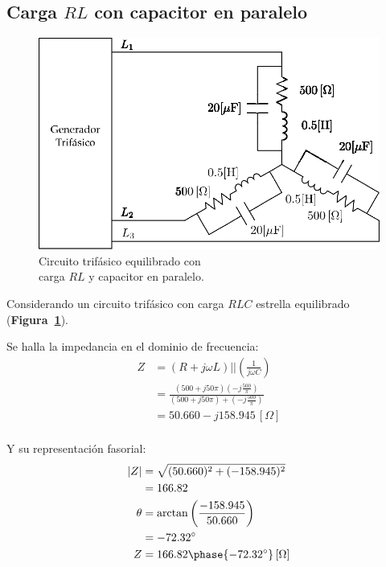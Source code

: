 \documentclass[letter,11pt]{article}
\begin{document}
\subsection{Carga $RL$ con capacitor en paralelo}
\begin{figure}[!h]
\centering
\includegraphics[scale=1]{figura3.eps}
\caption{Circuito trifásico equilibrado con \\carga $RL$ y capacitor en paralelo.}
\label{circuito3}
\end{figure}

Considerando un circuito trifásico con carga $RLC$ estrella equilibrado
(\textbf{Figura~\ref{circuito3}}).

Se halla la impedancia en el dominio de frecuencia:
\begin{equation*}
    \begin{split}
        Z &= (R+j\omega L)||(\frac{1}{j\omega C})\\
          &= \frac{(500+j50\pi)(-j\frac{500}{\pi})}{(500+j50\pi)+(-j\frac{500}{\pi})}\\
          &= 50.660-j158.945\,[\Omega]\\
    \end{split}
\end{equation*}

Y su representación fasorial:
\begin{equation*}
    \begin{split}
        |Z| &= \sqrt{(50.660)^2+(-158.945)^2}\\
            &= 166.82\\
        \theta &= \arctan\left(\frac{-158.945}{50.660}\right)\\
               &= -72.32^{\circ}\\
        Z &= 166.82\phase{-72.32^{\circ}}\,[\Omega]\\
    \end{split}
\end{equation*}
\end{document}
